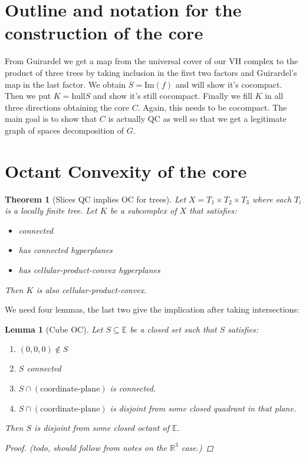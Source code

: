 \documentclass{article}
\theoremstyle{mystyle}
\newtheorem{thm}{Theorem}[section]
\newtheorem{lem}{Lemma}[section]
\theoremstyle{remark}
\begin{document}
\section{Outline and notation for the construction of the core}

	From Guirardel we get a map from the universal cover of our VH complex to the product of three trees by taking inclusion in the first two factors and Guirardel's map in the last factor. We obtain \(S = \text{Im}(f)\) and will show it's cocompact. Then we put \(K = \text{hull}{S}\) and show it's still cocompact. Finally we fill \(K\) in all three directions obtaining the core \(C\). Again, this needs to be cocompact. The main goal is to show that \(C\) is actually QC as well so that we get a legitimate graph of spaces decomposition of \(G\).

\section{Octant Convexity of the core}
\begin{thm}
    [\label{thm:QCOC}Slices QC implies OC for trees]
	Let \(X=T_{1} \times T_{2} \times T_{3}\) where each \(T_{i}\) is a locally finite tree. Let \(K\) be a subcomplex of \(X\) that satisfies: 
	\begin{itemize}
		\item connected
		\item has connected hyperplanes
		\item has cellular-product-convex hyperplanes 
	\end{itemize}
Then \(K\) is also cellular-product-convex.
\end{thm}
We need four lemmas, the last two give the implication after taking intersections:

\begin{lem}
	[\label{lem:cubeOC}Cube OC] Let \(S \subseteq \mathbb{E}  \) be a closed set such that \(S\) satisfies: 
	\begin{enumerate}
		\item \((0,0,0) \not\in S\) 
		\item \(S\) connected
		\item \(S \cap (\text{coordinate-plane})\) is connected.
		\item \(S \cap (\text{coordinate-plane})\) is disjoint from some closed quadrant in that plane.
	\end{enumerate}
	Then \(S\) is disjoint from some closed octant of \(\mathbb{E}\). 
	\begin{proof}
		(todo, should follow from notes on the \(\mathbb{R}^{3}\) case.)
	\end{proof}
\end{lem}
\end{document}
